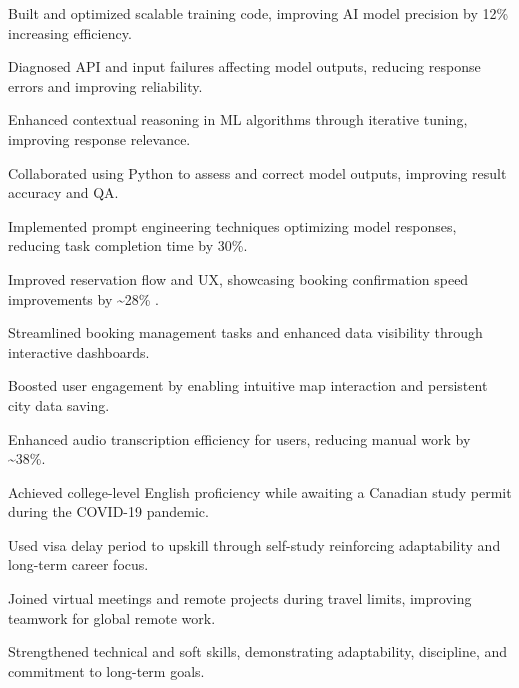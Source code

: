 \begin{zitemize}
\item Built and optimized scalable training code, improving AI model precision by 12\% increasing efficiency.
\item Diagnosed API and input failures affecting model outputs, reducing response errors and improving reliability.
\item Enhanced contextual reasoning in ML algorithms through iterative tuning, improving response relevance.
\item Collaborated using Python to assess and correct model outputs, improving result accuracy and QA.
\item Implemented prompt engineering techniques optimizing model responses, reducing task completion time by 30\%.
\end{zitemize}

\begin{zitemize}
\item Improved reservation flow and UX, showcasing booking confirmation speed improvements by \textasciitilde28\% .
\item Streamlined booking management tasks and enhanced data visibility through interactive dashboards.
\item Boosted user engagement by enabling intuitive map interaction and persistent city data saving.
\item Enhanced audio transcription efficiency for users, reducing manual work by \textasciitilde38\%.
\end{zitemize}

\begin{zitemize}
\item Achieved college-level English proficiency while awaiting a Canadian study permit during the COVID-19 pandemic.
\item Used visa delay period to upskill through self-study reinforcing adaptability and long-term career focus.
\item Joined virtual meetings and remote projects during travel limits, improving teamwork for global remote work.
\item Strengthened technical and soft skills, demonstrating adaptability, discipline, and commitment to long-term goals.
\end{zitemize}


